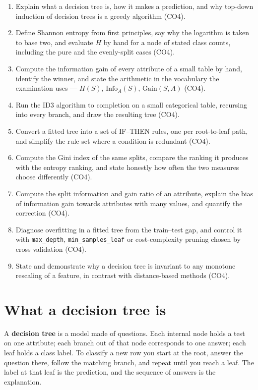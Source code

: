 \documentclass[11pt]{article}
\begin{document}
\begin{enumerate}[leftmargin=*]
  \item Explain what a decision tree is, how it makes a prediction, and why
    top-down induction of decision trees is a greedy algorithm (CO4).
  \item Define Shannon entropy from first principles, say why the logarithm is
    taken to base two, and evaluate $H$ by hand for a node of stated class
    counts, including the pure and the evenly-split cases (CO4).
  \item Compute the information gain of every attribute of a small table by
    hand, identify the winner, and state the arithmetic in the vocabulary the
    examination uses --- $H(S)$, $\mathrm{Info}_A(S)$, $\mathrm{Gain}(S,A)$
    (CO4).
  \item Run the ID3 algorithm to completion on a small categorical table,
    recursing into every branch, and draw the resulting tree (CO4).
  \item Convert a fitted tree into a set of IF--THEN rules, one per
    root-to-leaf path, and simplify the rule set where a condition is
    redundant (CO4).
  \item Compute the Gini index of the same splits, compare the ranking it
    produces with the entropy ranking, and state honestly how often the two
    measures choose differently (CO4).
  \item Compute the split information and gain ratio of an attribute, explain
    the bias of information gain towards attributes with many values, and
    quantify the correction (CO4).
  \item Diagnose overfitting in a fitted tree from the train--test gap, and
    control it with \texttt{max\_depth}, \texttt{min\_samples\_leaf} or
    cost-complexity pruning chosen by cross-validation (CO4).
  \item State and demonstrate why a decision tree is invariant to any
    monotone rescaling of a feature, in contrast with distance-based
    methods (CO4).
\end{enumerate}

\section{What a decision tree is}
\label{sec:tree}

A \textbf{decision tree} is a model made of questions. Each internal node
holds a test on one attribute; each branch out of that node corresponds to one
answer; each leaf holds a class label. To classify a new row you start at the
root, answer the question there, follow the matching branch, and repeat until
you reach a leaf. The label at that leaf is the prediction, and the sequence of
answers is the explanation.
\end{document}
